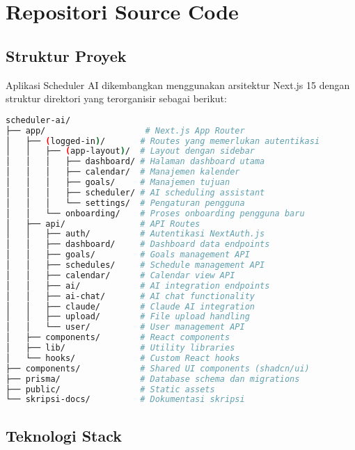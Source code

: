 \appendix
\section{Repositori Source Code}

\subsection{Struktur Proyek}

Aplikasi Scheduler AI dikembangkan menggunakan arsitektur Next.js 15 dengan struktur direktori yang terorganisir sebagai berikut:

\begin{lstlisting}[language=bash, caption=Struktur Direktori Utama]
scheduler-ai/
├── app/                    # Next.js App Router
│   ├── (logged-in)/       # Routes yang memerlukan autentikasi
│   │   ├── (app-layout)/  # Layout dengan sidebar
│   │   │   ├── dashboard/ # Halaman dashboard utama
│   │   │   ├── calendar/  # Manajemen kalender
│   │   │   ├── goals/     # Manajemen tujuan
│   │   │   ├── scheduler/ # AI scheduling assistant
│   │   │   └── settings/  # Pengaturan pengguna
│   │   └── onboarding/    # Proses onboarding pengguna baru
│   ├── api/               # API Routes
│   │   ├── auth/          # Autentikasi NextAuth.js
│   │   ├── dashboard/     # Dashboard data endpoints
│   │   ├── goals/         # Goals management API
│   │   ├── schedules/     # Schedule management API
│   │   ├── calendar/      # Calendar view API
│   │   ├── ai/            # AI integration endpoints
│   │   ├── ai-chat/       # AI chat functionality
│   │   ├── claude/        # Claude AI integration
│   │   ├── upload/        # File upload handling
│   │   └── user/          # User management API
│   ├── components/        # React components
│   ├── lib/               # Utility libraries
│   └── hooks/             # Custom React hooks
├── components/            # Shared UI components (shadcn/ui)
├── prisma/                # Database schema dan migrations
├── public/                # Static assets
└── skripsi-docs/          # Dokumentasi skripsi
\end{lstlisting}

\subsection{Teknologi Stack}


